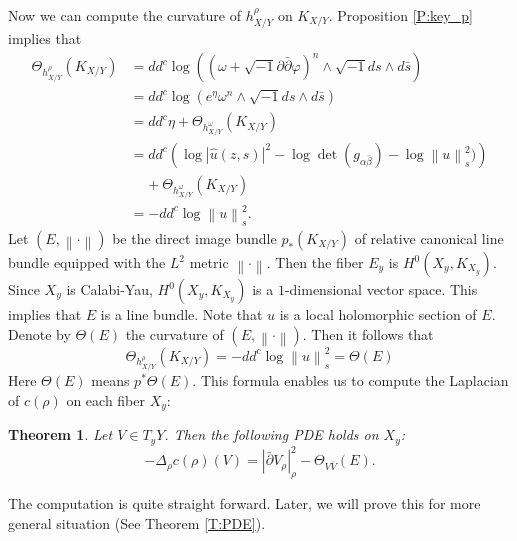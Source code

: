 \documentclass{amsart}
\newtheorem{theorem}{Theorem}[section]
\theoremstyle{definition}
\numberwithin{equation}{section}
\begin{document}
Now we can compute the curvature of $h_{X/Y}^\rho$ on $K_{X/Y}$. Proposition \ref{P:key_p} implies that
\begin{align*}
\Theta_{h^\rho_{X/Y}}(K_{X/Y})
& =
dd^c\log{\left({(\omega+{\sqrt{-1}}{\partial\bar\partial}\varphi)^n\wedge{\sqrt{-1}} ds\wedge d\bar s}\right)} 
\\
& =
dd^c\log{\left({e^{\eta}\omega^n\wedge{\sqrt{-1}} ds\wedge d\bar s}\right)} 
\\
& = 
dd^c\eta+\Theta_{h^\omega_{X/Y}}(K_{X/Y}) 
\\
& =
dd^c{\left({\log{\left\vert{\hat u(z,s)}\right\vert}^2-\log\det(g_{\alpha\bar\beta})-\log{\left\|{u}\right\|}_s^2)}\right)}
\\
&\;\;\;\;+\Theta_{h^\omega_{X/Y}}(K_{X/Y}) 
\\
& =
-dd^c\log{\left\|{u}\right\|}_s^2.
\end{align*}
Let $(E,{\left\|\cdot\right\|})$ be the direct image bundle $p_*(K_{X/Y})$ of relative canonical line bundle equipped with the $L^2$ metric ${\left\|\cdot\right\|}$. Then the fiber $E_y$ is $H^0(X_y,K_{X_y})$. Since $X_y$ is Calabi-Yau, $H^0(X_y,K_{X_y})$ is a $1$-dimensional vector space. This implies that $E$ is a line bundle. Note that $u$ is a local holomorphic section of $E$. Denote by $\Theta(E)$ the curvature of $(E,{\left\|\cdot\right\|})$. Then it follows that
\begin{equation} \label{E:curvature_of_RCLB}
\Theta_{h^\rho_{X/Y}}(K_{X/Y})
=
-dd^c\log{\left\|{u}\right\|}_s^2
=
\Theta(E)
\end{equation}
Here $\Theta(E)$ means $p^*\Theta(E)$. This formula enables us to compute the Laplacian of $c(\rho)$ on each fiber $X_y$:

\begin{theorem}\label{T:PDE0}
Let $V\in T_yY$. Then the following PDE holds on $X_y$:
\begin{equation}\label{E:PDE0}
-\Delta_\rho c(\rho)(V)
=
{\left\vert{\bar\partial V_\rho}\right\vert}_\rho^2-\Theta_{V\bar V}(E).
\end{equation}
\end{theorem}
The computation is quite straight forward. Later, we will prove this for more general situation (See Theorem \ref{T:PDE}). 
\end{document}
